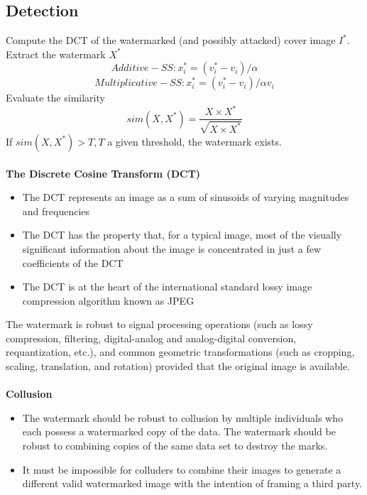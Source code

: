 \documentclass[10pt,a4paper]{book}
\begin{document}
\subsection{Detection}
Compute the DCT of the watermarked (and possibly attacked) cover image $I^{*}$.\\
Extract the watermark $X^{*}$
$$ Additive-SS: x_i^{*} = (v_i^{*}-v_i)/\alpha $$
$$ Multiplicative-SS: x_i^{*} = (v_i^{*}-v_i)/\alpha v_i$$
Evaluate the similarity
$$ sim(X,X^{*}) = \frac{X \times X^{*}}{\sqrt{X \times X^{*}}}$$
If $sim(X,X^{*})>T,T$ a given threshold, the watermark exists.\\\\
\textbf{The Discrete Cosine Transform (DCT)}
\begin{itemize}
\item The DCT represents an image as a sum of sinusoids of varying magnitudes and frequencies 
\item The DCT has the property that, for a typical image, most of the visually significant information    about the image is concentrated in just a few coefficients of the DCT 
\item The DCT is at the heart of the international standard lossy image compression algorithm known as JPEG
\end{itemize}

The watermark is robust to signal processing operations (such as lossy compression, filtering, digital-analog and analog-digital conversion, requantization, etc.), and common geometric transformations (such as cropping, scaling, translation, and rotation) provided that the original image is available.\\\\
\textbf{Collusion}
\begin{itemize}
\item The watermark should be robust to collusion by multiple individuals who each possess a watermarked copy of the data. The watermark should be robust to combining copies of the same data set to destroy the marks. 
\item It must be impossible for colluders to combine their images to 
generate a different valid watermarked image with the 
intention of framing a third party.
\end{itemize}
\newpage
\end{document}

